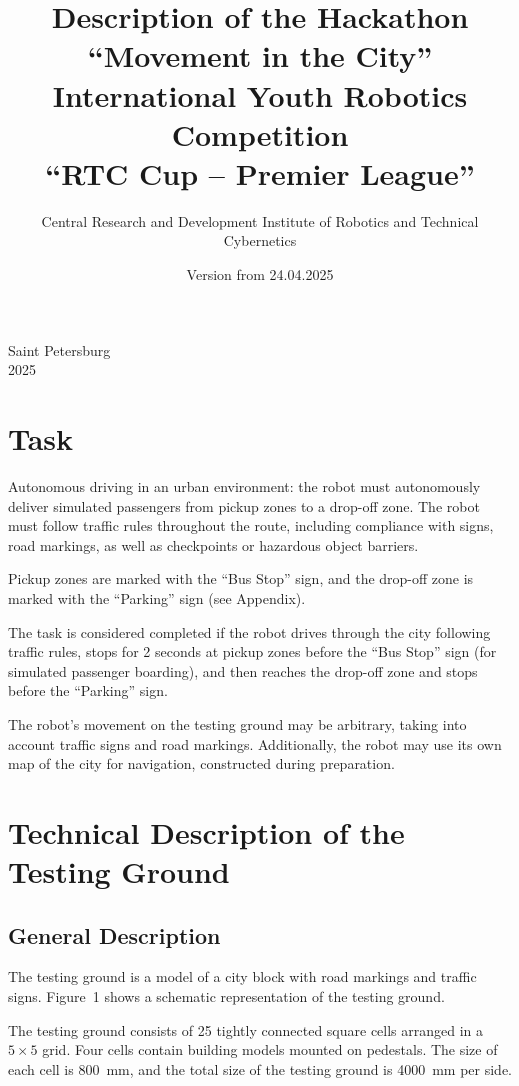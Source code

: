 \documentclass[a4paper,12pt]{article}
\title{Description of the Hackathon ``Movement in the City''\\
International Youth Robotics Competition\\
``RTC Cup -- Premier League''}
\author{Central Research and Development Institute of Robotics and Technical Cybernetics}
\date{Version from 24.04.2025}
\begin{document}
\maketitle

\begin{center}
Saint Petersburg\\
2025
\end{center}

\tableofcontents
\newpage

\section{Task}

Autonomous driving in an urban environment: the robot must autonomously deliver simulated passengers from pickup zones to a drop-off zone. The robot must follow traffic rules throughout the route, including compliance with signs, road markings, as well as checkpoints or hazardous object barriers.

Pickup zones are marked with the ``Bus Stop'' sign, and the drop-off zone is marked with the ``Parking'' sign (see Appendix).

The task is considered completed if the robot drives through the city following traffic rules, stops for 2 seconds at pickup zones before the ``Bus Stop'' sign (for simulated passenger boarding), and then reaches the drop-off zone and stops before the ``Parking'' sign.

The robot's movement on the testing ground may be arbitrary, taking into account traffic signs and road markings. Additionally, the robot may use its own map of the city for navigation, constructed during preparation.

\section{Technical Description of the Testing Ground}

\subsection{General Description}

The testing ground is a model of a city block with road markings and traffic signs. Figure~1 shows a schematic representation of the testing ground.

The testing ground consists of 25 tightly connected square cells arranged in a $5 \times 5$ grid. Four cells contain building models mounted on pedestals. The size of each cell is 800~mm, and the total size of the testing ground is 4000~mm per side.
\end{document}
